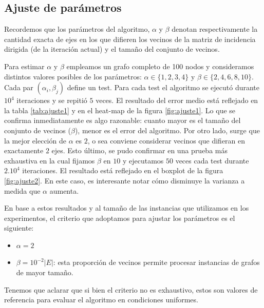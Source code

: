 \documentclass[10pt, a4paper, twocolumn]{article} %
\begin{document}
\subsection{Ajuste de parámetros}

Recordemos que los parámetros del algoritmo, $\alpha$ y $\beta$ denotan 
respectivamente la cantidad exacta de ejes en los que difieren los 
vecinos de la matriz de incidencia dirigida (de la iteración actual) y 
el tamaño del conjunto de vecinos.

\smallskip

Para estimar $\alpha$ y $\beta$ empleamos un grafo completo de 100 
nodos y consideramos distintos valores posibles de los parámetros: 
$\alpha \in \{1,2,3,4\}$ y $\beta \in \{2,4,6,8,10\}$. Cada par 
$(\alpha_i, \beta_j)$ define un test. Para cada test el algoritmo se 
ejecutó durante $10^4$ iteraciones y se repitió $5$ veces. El resultado 
del error medio está reflejado en la tabla \ref{tab:ajuste1} y en el 
heat-map de la figura \ref{fig:ajuste1}. Lo que se confirma 
inmediatamente es algo razonable: cuanto mayor es el tamaño del 
conjunto de vecinos ($\beta$), menor es el error del algoritmo. Por 
otro lado, surge que la mejor elección de $\alpha$ es $2$, o sea 
conviene considerar vecinos que difieran en exactamente $2$ ejes. Esto 
último, se pudo confirmar en una prueba más exhaustiva en la cual 
fijamos $\beta$ en $10$ y ejecutamos $50$ veces cada test durante 
$2 . 10^4$ iteraciones. El resultado está reflejado en el boxplot de la 
figura \ref{fig:ajuste2}. En este caso, es interesante notar cómo 
disminuye la varianza a medida que $\alpha$ aumenta.

\smallskip

En base a estos resultados y al tamaño de las instancias que utilizamos 
en los experimentos, el criterio que adoptamos para ajustar los 
parámetros es el siguiente:

\begin{itemize}
	\item $\alpha = 2$
	\item $\beta = 10^{-2} |E|$: esta proporción de vecinos permite 
	procesar instancias de grafos de mayor tamaño.
\end{itemize}

Tenemos que aclarar que si bien el criterio no es exhaustivo, estos son 
valores de referencia para evaluar el algoritmo en condiciones 
uniformes.
\end{document}
